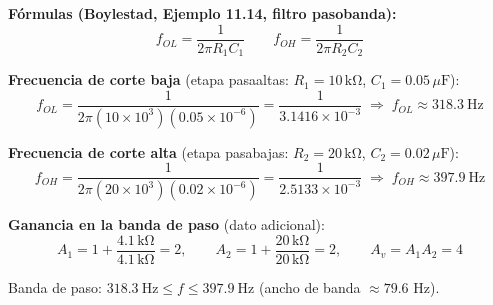 \documentclass[11pt]{article}
\begin{document}
\textbf{Fórmulas (Boylestad, Ejemplo 11.14, filtro pasobanda):}
\[
f_{OL} = \frac{1}{2\pi R_1 C_1}\qquad f_{OH} = \frac{1}{2\pi R_2 C_2}
\]

\textbf{Frecuencia de corte baja} (etapa pasaaltas: $R_1=10\,\mathrm{k\Omega}$, $C_1=0.05\,\mu\mathrm{F}$):
\[
f_{OL} = \frac{1}{2\pi (10\times10^{3})(0.05\times10^{-6})}
= \frac{1}{3.1416\times10^{-3}}
\;\Rightarrow\;
\boxed{f_{OL} \approx 318.3\ \mathrm{Hz}}
\]

\textbf{Frecuencia de corte alta} (etapa pasabajas: $R_2=20\,\mathrm{k\Omega}$, $C_2=0.02\,\mu\mathrm{F}$):
\[
f_{OH} = \frac{1}{2\pi (20\times10^{3})(0.02\times10^{-6})}
= \frac{1}{2.5133\times10^{-3}}
\;\Rightarrow\;
\boxed{f_{OH} \approx 397.9\ \mathrm{Hz}}
\]

\textbf{Ganancia en la banda de paso} (dato adicional):
\[
A_1 = 1+\frac{4.1\,\mathrm{k\Omega}}{4.1\,\mathrm{k\Omega}} = 2,\qquad
A_2 = 1+\frac{20\,\mathrm{k\Omega}}{20\,\mathrm{k\Omega}} = 2,\qquad
A_v = A_1A_2 = 4
\]

Banda de paso: $318.3\ \mathrm{Hz} \le f \le 397.9\ \mathrm{Hz}$ \quad (ancho de banda $\approx 79.6$ Hz).
\end{document}
